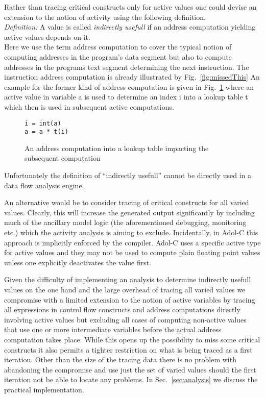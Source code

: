 \documentclass{article}
\newcommand{\refsec}[1]{{Sec.~\ref{#1}}}
\newcommand{\reffig}[1]{{Fig.~\ref{#1}}}
\begin{document}
Rather than tracing critical constructs only for  active values 
one could devise an extension to the notion of activity using the following 
definition.\\
{\em Definition: } A value is called {\em indirectly usefull} 
if an address computation yielding active values depends on it.\\
Here we use the term  address computation to cover the typical notion of 
computing addresses in the program's data segment but also to compute 
addresses in the programs text segment determining the next instruction. 
The instruction address computation is already illustrated by \reffig{fig:missedThis}
An example for the former kind of address computation is given in 
\reffig{fig:addressComp} where an active value in variable a is used to 
determine an index i into a lookup table t which then is used in 
subsequent active computations.
\begin{figure}
\begin{lstlisting}
i = int(a) 
a = a * t(i)
\end{lstlisting}
\caption{An address computation into a lookup table impacting the subsequent computation}\label{fig:addressComp} 
\end{figure}
Unfortunately the definition of ``indirectly usefull'' cannot be directly used in a 
data flow analysis engine. 

An alternative would be to consider tracing of critical constructs for all varied values. 
Clearly, this will increase the generated output significantly by including much 
of the ancillary model logic (the aforementioned debugging, monitoring etc.) which 
the activity analysis is aiming to exclude. 
Incidentally, in Adol-C this approach is implicitly enforced by the compiler. 
Adol-C uses a specific  
active type for active values and they may not be used to 
compute plain floating point values unless one 
explicitly deactivates the value first. 

Given the difficulty of implementing an analysis to determine indirectly usefull values 
on the one hand and the large overhead of tracing all varied values we 
compromise with a limited extension to the notion of active variables by tracing  
all expressions in control flow constructs and address computations directly involving active values
but excluding all cases of computing non-active values that use one or more intermediate 
variables before the actual address computation takes place. 
While this opens up the possibility to miss some critical constructs 
it also permits a tighter restriction on what is being traced as a first iteration. 
Other than the size of the tracing data  there is no problem with abandoning the compromise
and use just the set of varied values should the first iteration not be able to 
locate any problems.    
In \refsec{sec:analysis} we discuss the practical implementation.
\end{document}
